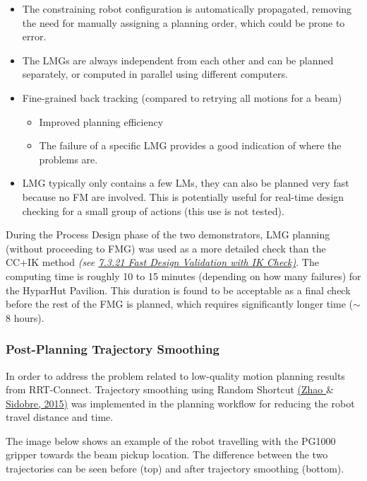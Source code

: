 \documentclass[11pt]{book}
\begin{document}
\begin{itemize}
	\item The constraining robot configuration is automatically propagated, removing the need for manually assigning a planning order, which could be prone to error.

	\item The LMGs are always independent from each other and can be planned separately, or computed in parallel using different computers.

	\item Fine-grained back tracking (compared to retrying all motions for a beam)

\begin{itemize}
	\item Improved planning efficiency

	\item The failure of a specific LMG provides a good indication of where the problems are.

\end{itemize}
	\item LMG typically only contains a few LMs, they can also be planned very fast because no FM are involved. This is potentially useful for real-time design checking for a small group of actions (this use is not tested).

\end{itemize}
During the Process Design phase of the two demonstrators, LMG planning (without proceeding to FMG) was used as a more detailed check than the CC+IK method\textit{ (see \uline{7.3.21 Fast Design Validation with IK Check)}}. The computing time is roughly 10 to 15 minutes (depending on how many failures) for the HyparHut Pavilion. This duration is found to be acceptable as a final check before the rest of the FMG is planned, which requires significantly longer time ($\sim$ 8 hours).

\subsubsection{Post-Planning Trajectory Smoothing}

In order to address the problem related to low-quality motion planning results from RRT-Connect. Trajectory smoothing using Random Shortcut \href{https://www.zotero.org/google-docs/?kdUrGV}{(Zhao $\&$ Sidobre, 2015)}\textit{ }was implemented in the planning workflow for reducing the robot travel distance and time.

The image below shows an example of the robot travelling with the PG1000 gripper towards the beam pickup location. The difference between the two trajectories can be seen before (top) and after trajectory smoothing (bottom). 
\end{document}
